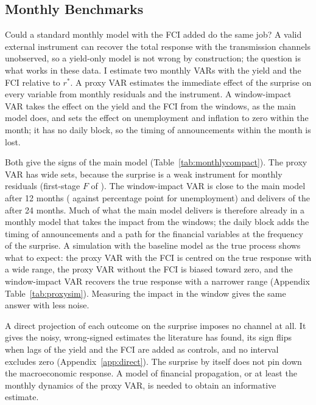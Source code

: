 \documentclass[11pt]{article}
\newcommand{\rs}{r^{*}}
\begin{document}
\subsection{Monthly Benchmarks}\label{sec:monthlyvar}
Could a standard monthly model with the FCI added do the same job? A valid external instrument can recover the total response with the transmission channels unobserved, so a yield-only model is not wrong by construction; the question is what works in these data. I estimate two monthly VARs with the yield and the FCI relative to $\rs$. A proxy VAR estimates the immediate effect of the surprise on every variable from monthly residuals and the instrument. A window-impact VAR takes the effect on the yield and the FCI from the windows, as the main model does, and sets the effect on unemployment and inflation to zero within the month; it has no daily block, so the timing of announcements within the month is lost.



Both give the signs of the main model (Table~\ref{tab:monthlycompact}). The proxy VAR has wide sets, because the surprise is a weak instrument for monthly residuals (first-stage $F$ of ). The window-impact VAR is close to the main model after 12 months ( against  percentage point for unemployment) and delivers  of the  after 24 months. Much of what the main model delivers is therefore already in a monthly model that takes the impact from the windows; the daily block adds the timing of announcements and a path for the financial variables at the frequency of the surprise. A simulation with the baseline model as the true process shows what to expect: the proxy VAR with the FCI is centred on the true response with a wide range, the proxy VAR without the FCI is biased toward zero, and the window-impact VAR recovers the true response with a narrower range (Appendix Table~\ref{tab:proxysim}). Measuring the impact in the window gives the same answer with less noise.

A direct projection of each outcome on the surprise imposes no channel at all. It gives the noisy, wrong-signed estimates the literature has found, its sign flips when lags of the yield and the FCI are added as controls, and no interval excludes zero (Appendix~\ref{app:direct}). The surprise by itself does not pin down the macroeconomic response. A model of financial propagation, or at least the monthly dynamics of the proxy VAR, is needed to obtain an informative estimate.
\end{document}
